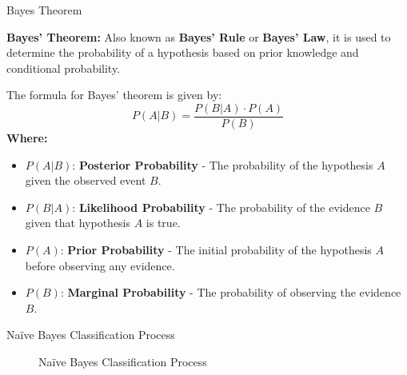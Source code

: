 \begin{frame}{Bayes Theorem}
	
	\textbf{Bayes' Theorem:} Also known as \textbf{Bayes' Rule} or \textbf{Bayes' Law}, it is used to determine the probability of a hypothesis based on prior knowledge and conditional probability.
	
	The formula for Bayes' theorem is given by:
	\[
	P(A|B) = \frac{P(B|A) \cdot P(A)}{P(B)}
	\]
	\textbf{Where:}
\begin{itemize}
	\item \( P(A|B) \): \textbf{Posterior Probability} - The probability of the hypothesis \( A \) given the observed event \( B \).
	\item \( P(B|A) \): \textbf{Likelihood Probability} - The probability of the evidence \( B \) given that hypothesis \( A \) is true.
	\item \( P(A) \): \textbf{Prior Probability} - The initial probability of the hypothesis \( A \) before observing any evidence.
	\item \( P(B) \): \textbf{Marginal Probability} - The probability of observing the evidence \( B \).
\end{itemize}
\end{frame}
\begin{frame}{Naïve Bayes Classification Process}
\begin{figure}
	\centering
{}
\caption{Naïve Bayes Classification Process}
\label{fig:Naïve Bayes Classification Process}
\end{figure}
\end{frame}
